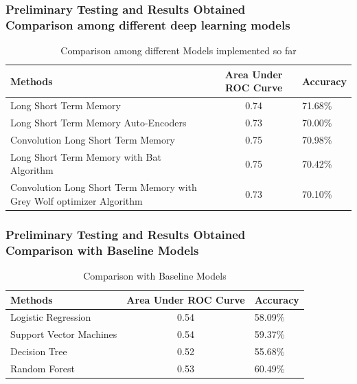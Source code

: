\documentclass{beamer}
\begin{document}
\begin{frame}\frametitle{Preliminary Testing and Results Obtained\\\footnotesize{Comparison among different deep learning models}}
    \begin{table}[h]
        \centering
            \begin{tabular}{ | p{4cm} | c | p{2cm} |}
                \hline
                Methods & Area Under ROC Curve & Accuracy\\
                \hline
                Long Short Term Memory & 0.74 & 71.68\%\\
                \hline
                Long Short Term Memory Auto-Encoders & 0.73 & 70.00\%\\
                \hline
                Convolution Long Short Term Memory & 0.75 & 70.98\%\\
                \hline
                Long Short Term Memory with Bat Algorithm & 0.75 & 70.42\%\\
                \hline
                Convolution Long Short Term Memory with Grey Wolf optimizer Algorithm & 0.73 & 70.10\%\\
                \hline
            \end{tabular}
            \caption{Comparison among different Models implemented so far}
        \label{tab:tri}
    \end{table}
\end{frame}
\begin{frame}\frametitle{Preliminary Testing and Results Obtained\\ \footnotesize{Comparison with Baseline Models}}
\begin{table}[h]
    \centering
        \begin{tabular}{ | p{4cm} | c | p{2cm} | }
            \hline
            Methods & Area Under ROC Curve & Accuracy\\
            \hline
            Logistic Regression & 0.54 & 58.09\%\\
            \hline
            Support Vector Machines & 0.54 & 59.37\%\\
            \hline
            Decision Tree & 0.52 & 55.68\%\\
            \hline
            Random Forest & 0.53 & 60.49\%\\
            \hline
        \end{tabular}
        \caption{Comparison with Baseline Models}
    \label{tab:tri}
\end{table}
    
\end{frame}
\end{document}
